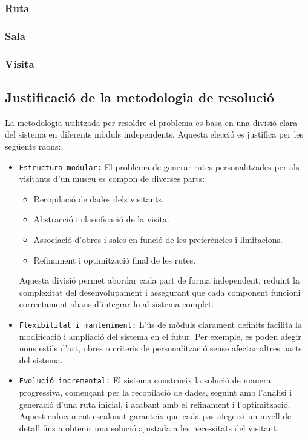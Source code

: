 \documentclass[a4paper]{article}
\begin{document}
	\subsubsection*{Ruta}
	
	\subsubsection*{Sala}
	
	\subsubsection*{Visita}
	
	\subsection{Justificació de la metodologia de resolució}
	
	La metodologia utilitzada per resoldre el problema es basa en una divisió clara del sistema en diferents mòduls independents. Aquesta elecció es justifica per les següents raons:
	
	\begin{itemize}
		\item \texttt{Estructura modular:} El problema de generar rutes personalitzades per als visitants d’un museu es compon de diverses parts:
		\begin{itemize}
			\item Recopilació de dades dels visitants.
			\item Abstracció i classificació de la visita.
			\item Associació d’obres i sales en funció de les preferències i limitacions.
			\item Refinament i optimització final de les rutes.
		\end{itemize}
		Aquesta divisió permet abordar cada part de forma independent, reduint la complexitat del desenvolupament i assegurant que cada component funcioni correctament abans d’integrar-lo al sistema complet.
		
		\item \texttt{Flexibilitat i manteniment:} L'ús de mòduls clarament definits facilita la modificació i ampliació del sistema en el futur. Per exemple, es poden afegir nous estils d’art, obres o criteris de personalització sense afectar altres parts del sistema.
		
		\item \texttt{Evolució incremental:} El sistema construeix la solució de manera progressiva, començant per la recopilació de dades, seguint amb l’anàlisi i generació d’una ruta inicial, i acabant amb el refinament i l’optimització. Aquest enfocament escalonat garanteix que cada pas afegeixi un nivell de detall fins a obtenir una solució ajustada a les necessitats del visitant.
		
	\end{itemize}
	
\end{document}
